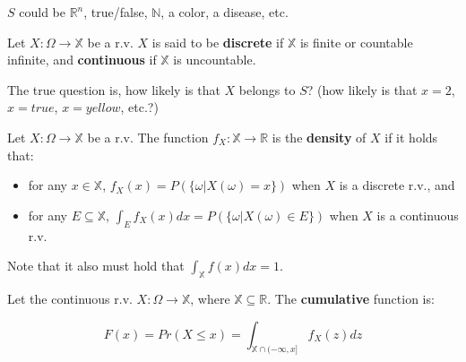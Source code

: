 \documentclass[aspectratio=169]{beamer}
\begin{document}
\begin{frame}
    $S$ could be $\mathbb{R}^n$, true/false, $\mathbb{N}$, a color, a disease, etc.\pause
    
    \vspace{0.5cm}
    
    \begin{definition}
        Let $X:\Omega\rightarrow\mathbb{X}$ be a r.v. $X$ is said to be \textbf{discrete} if $\mathbb{X}$ is finite or countable infinite, and \textbf{continuous} if $\mathbb{X}$ is uncountable.
    \end{definition}
    
    \vspace{0.5cm}
    
    The true question is, how likely is that $X$ belongs to $S$? (how likely is that $x=2$, $x=true$, $x=yellow$, etc.?)
\end{frame}

\begin{frame}
    \begin{definition}
        Let $X:\Omega\rightarrow\mathbb{X}$ be a r.v. The function $f_X:\mathbb{X}\rightarrow\mathbb{R}$ is the \textbf{density} of $X$ if it holds that:
        \vspace{0.3cm}

        \begin{itemize}
            \item for any $x\in\mathbb{X}$, $f_X(x)=P(\{\omega|X(\omega)=x\})$ when $X$ is a discrete r.v., and
            \vspace{0.3cm}
            \item for any $E\subseteq \mathbb{X}$, $\int_E f_X(x)dx=P(\{\omega|X(\omega)\in E\})$ when $X$ is a continuous r.v.
        \end{itemize}
        
    \end{definition}
    
    Note that it also must hold that $\int_\mathbb{X} f(x)dx=1$.
\end{frame}

\begin{frame}
    \begin{definition}
    Let the continuous r.v. $X:\Omega\rightarrow \mathbb{X}$, where $\mathbb{X}\subseteq\mathbb{R}$. The \textbf{cumulative} function is:
    
    $$F(x) = Pr(X\leq x) = \int_{\mathbb{X}\cap(-\infty,x]}f_X(z)dz$$
    \end{definition}
\end{frame}
\end{document}
